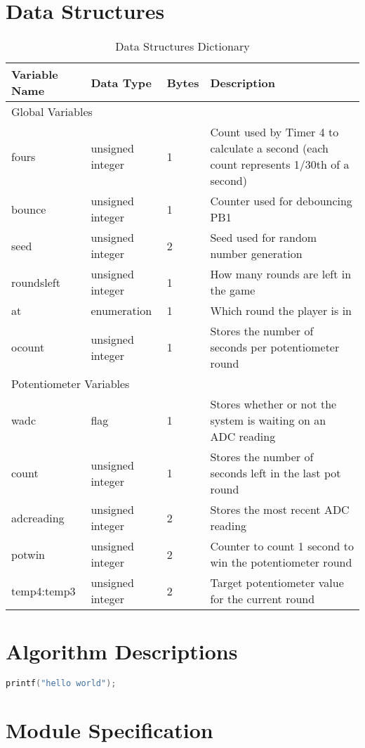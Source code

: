 \documentclass[a4paper]{article}
\begin{document}
\section{Data Structures}
\begin{table}[H]
\centering
\caption{Data Structures Dictionary}
\label{tbl:dict}
\begin{tabular}{@{}lllp{9cm}@{}}
\toprule
Variable Name & Data Type        & Bytes & Description \\ \midrule
\multicolumn{4}{l}{Global Variables} \\ \midrule
fours         & unsigned integer & 1     & Count used by Timer 4 to calculate a second (each count represents 1/30th of a second) \\
bounce        & unsigned integer & 1     & Counter used for debouncing PB1 \\
seed          & unsigned integer & 2     & Seed used for random number generation \\
roundsleft    & unsigned integer & 1     & How many rounds are left in the game \\
at            & enumeration      & 1     & Which round the player is in \\
ocount        & unsigned integer & 1     & Stores the number of seconds per potentiometer round \\ \midrule
\multicolumn{4}{l}{Potentiometer Variables} \\ \midrule
wadc          & flag             & 1     & Stores whether or not the system is waiting on an ADC reading \\
count         & unsigned integer & 1     & Stores the number of seconds left in the last pot round \\
adcreading	& unsigned integer	& 2 & Stores the most recent ADC reading \\  
potwin		& unsigned integer	& 2	& Counter to count 1 second to win the potentiometer round \\ 
temp4:temp3	& unsigned integer	& 2	& Target potentiometer value for the current round \\

\bottomrule
\end{tabular}
\end{table}

\section{Algorithm Descriptions}

\begin{lstlisting}[language=C]
printf("hello world");
\end{lstlisting}

\section{Module Specification}
\end{document}
